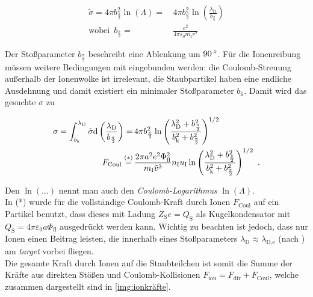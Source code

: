 \documentclass[numbers=noenddot,a4paper,notitlepage,twoside,BCOR15mm]{scrbook}
\newcommand{\degree}{^\circ}
\newcommand{\diff}{\textnormal{d}}
\newcommand{\ix}[1]{_\text{#1}}
\newcommand{\tilt}[1]{\textit{#1}}
\begin{document}
					\begin{align}
						\tilde{\sigma}=4\pi b_{\frac{\pi}{2}}^2\ln\left(\Lambda\right)=&\,4\pi b_{\frac{\pi}{2}}^2\ln\left(\frac{\lambda\ix{D}}{b_{\frac{\pi}{2}}}\right) \\
						\text{wobei }\, b_{\frac{\pi}{2}}=&\,\frac{e^2}{4\pi\varepsilon\ix{0}m\ix{I}v^2} \nonumber
					\end{align}

				Der Stoßparameter $b_{\frac{\pi}{2}}$ beschreibt eine Ablenkung um $\unit[90]{\degree}$. Für die Ionenreibung müssen weitere Bedingungen mit eingebunden werden: die Coulomb-Streuung außerhalb der Ionenwolke ist irrelevant, die Staubpartikel haben eine endliche Ausdehnung und damit existiert ein minimaler Stoßparameter $b\ix{k}$. Damit wird das gesuchte $\sigma$ zu

					\begin{align}
						\sigma=\int_{b\ix{k}}^{\lambda\ix{D}}\tilde{\sigma}\diff\left(\frac{\lambda\ix{D}}{b_{\frac{\pi}{2}}}\right)=&\,4\pi b_{\frac{\pi}{2}}^2\ln\left(\frac{\lambda\ix{D}^2+b_{\frac{\pi}{2}}^2}{b\ix{k}^2+b_{\frac{\pi}{2}}^2}\right)^{1/2} \nonumber \\
						F\ix{Coul}\overset{(*)}{=}&\,\frac{2\pi a^2 e^2\Phi\ix{fl}^2}{m\ix{I}\tilde{v}^3}n\ix{I}u\ix{I}\ln\left(\frac{\lambda\ix{D}^2+b_{\frac{\pi}{2}}^2}{b\ix{k}^2+b_{\frac{\pi}{2}}^2}\right)^{1/2} \, \, .
					\end{align}

				Den $\ln\left(\dots\right)$ nennt man auch den \tilt{Coulomb-Logarithmus} $\ln\left(\Lambda\right)$.\\
				In (*) wurde für die vollständige Coulomb-Kraft durch Ionen $F\ix{Coul}$ auf ein Partikel benutzt, dass dieses mit Ladung $Z\ix{S}e=Q\ix{S}$ als Kugelkondensator mit $Q\ix{S}=4\pi\varepsilon\ix{0}a\Phi\ix{fl}$ ausgedrückt werden kann. Wichtig zu beachten ist jedoch, dass nur Ionen einen Beitrag leisten, die innerhalb eines Stoßparameters $\lambda\ix{D}\approx\lambda\ix{D,e}$ (nach \cite{Kilgore93}) am \tilt{target} vorbei fliegen.\\
				Die gesamte Kraft durch Ionen auf die Staubteilchen ist somit die Summe der Kräfte aus direkten Stößen und Coulomb-Kollisionen $F\ix{ion}=F\ix{dir}+F\ix{Coul}$, welche zusammen dargestellt sind in \autoref{img:ionkräfte}.
\end{document}
